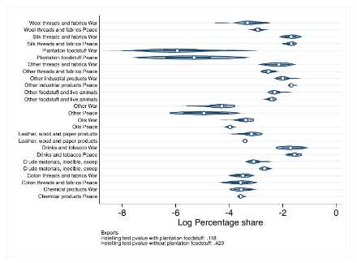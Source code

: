 \documentclass[12pt,a4paper,notitlepage,english]{article}
\begin{document}
\begin{figure}
\includegraphics[scale=.63]{post_blockade_distribution_X}
\end{figure}
\end{document}
